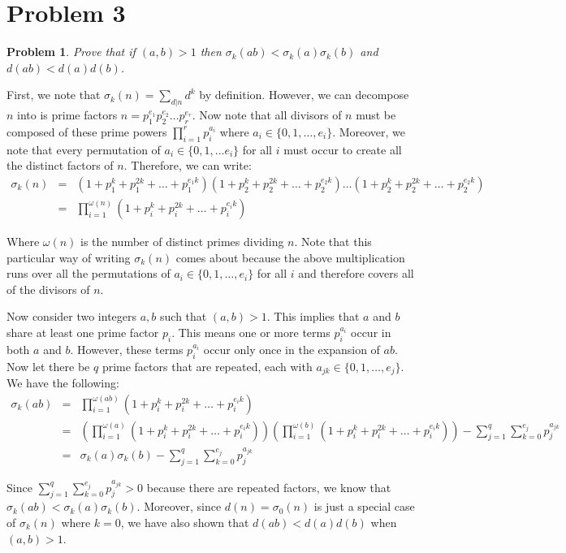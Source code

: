 \documentclass[psamsfonts]{amsart}
\newtheorem{prob}{Problem}[section]
\newenvironment{sol}{{\bfseries Solution}}{\qedsymbol}
\theoremstyle{definition}
\theoremstyle{remark}
\numberwithin{equation}{section}
\begin{document}
\section{Problem 3}

\begin{prob}
Prove that if $(a,b) > 1$ then $\sigma_k(ab) < \sigma_k(a) \sigma_k(b)$ and $d(ab) < d(a)d(b)$. 
\end{prob}

\begin{sol}
First, we note that $\sigma_k(n) = \sum_{d|n} d^k$ by definition. However, we can decompose $n$ into is prime factors $n = p_1^{e_1} p_2^{e_2} \ldots p_r^{e_r}$. Now note that all divisors of $n$ must be composed of these prime powers $\prod_{i=1}^{r} p_i^{a_i}$ where $a_i \in \{0, 1, \ldots, e_i\}$. Moreover, we note that every permutation of $a_i \in \{0, 1, \ldots e_i\}$ for all $i$ must occur to create all the distinct factors of $n$. Therefore, we can write:
\begin{eqnarray}
\sigma_k(n) &=& \left(1 + p_1^k + p_1^{2k} + \ldots + p_1^{e_1 k} \right) \left(1 + p_2^k + p_2^{2k} + \ldots + p_2^{e_2 k} \right) \ldots  \left(1 + p_2^k + p_2^{2k} + \ldots + p_2^{e_2 k} \right) \\ 
&=& \prod_{i=1}^{\omega(n)} \left(1 + p_i^k + p_i^{2k} + \ldots + p_i^{e_i k} \right)
\end{eqnarray} 

Where $\omega(n)$ is the number of distinct primes dividing $n$. Note that this particular way of writing $\sigma_k(n)$ comes about because the above multiplication runs over all the permutations of $a_i \in \{0,1, \ldots, e_i\}$ for all $i$ and therefore covers all of 
the divisors of $n$. 

Now consider two integers $a,b$ such that $(a,b) > 1$. This implies that $a$ and $b$ share at least one prime factor $p_i$. This means one or more terms $p_i^{a_i}$ occur in both $a$ and $b$. However, these terms $p_i^{a_i}$ occur only once in the expansion of $ab$. Now let there be $q$ prime factors that are repeated, each with $a_{jk} \in \{0,1, \ldots, e_j\}$. We have the following:
\begin{eqnarray}
\sigma_k(ab) &=& \prod_{i=1}^{\omega(ab)}  \left(1 + p_i^k + p_i^{2k} + \ldots + p_i^{e_i k} \right) \\
&=&  \left( \prod_{i=1}^{\omega(a)} \left(1 + p_i^k + p_i^{2k} + \ldots + p_i^{e_i k} \right) \right) \left( \prod_{i=1}^{\omega(b)} \left(1 + p_i^k + p_i^{2k} + \ldots + p_i^{e_i k} \right) \right) - \sum_{j=1}^q \sum_{k=0}^{e_j} p_j^{a_{jk}} \\
&=& \sigma_k(a) \sigma_k(b)  - \sum_{j=1}^q \sum_{k=0}^{e_j} p_j^{a_{jk}}
\end{eqnarray}

Since $\sum_{j=1}^q \sum_{k=0}^{e_j} p_j^{a_{jk}} > 0$ because there are repeated factors, we know that $\sigma_k(ab) < \sigma_k(a) \sigma_k(b)$. Moreover, since $d(n) = \sigma_0(n)$ is just a special case of $\sigma_k(n)$ where $k = 0$, we have also shown that $d(ab) < d(a) d(b)$ when $(a,b) > 1$. 
\end{sol}
\end{document}
